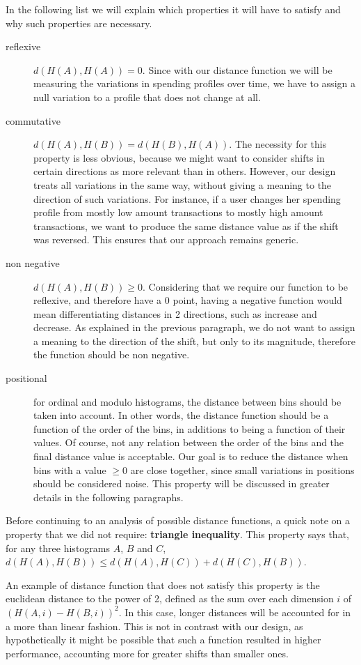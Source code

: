 In the following list we will explain which properties it will have to satisfy and why such properties are necessary.
\begin{description}
  \item[reflexive] $d(H(A), H(A)) = 0$. Since with our distance function we will be measuring the variations in spending profiles over time, we have to assign a null variation to a profile that does not change at all.
  \item[commutative] $d(H(A), H(B)) = d(H(B), H(A))$. The necessity for this property is less obvious, because we might want to consider shifts in certain directions as more relevant than in others. However, our design treats all variations in the same way, without giving a meaning to the direction of such variations. For instance, if a user changes her spending profile from mostly low amount transactions to mostly high amount transactions, we want to produce the same distance value as if the shift was reversed. This ensures that our approach remains generic.
  \item[non negative] $d(H(A), H(B)) \geq 0$. Considering that we require our function to be reflexive, and therefore have a $0$ point, having a negative function would mean differentiating distances in 2 directions, such as increase and decrease. As explained in the previous paragraph, we do not want to assign a meaning to the direction of the shift, but only to its magnitude, therefore the function should be non negative.
  \item[positional] for ordinal and modulo histograms, the distance between bins should be taken into account. In other words, the distance function should be a function of the order of the bins, in additions to being a function of their values. Of course, not any relation between the order of the bins and the final distance value is acceptable. Our goal is to reduce the distance when bins with a value $\geq 0$ are close together, since small variations in positions should be considered noise. This property will be discussed in greater details in the following paragraphs.
\end{description}

Before continuing to an analysis of possible distance functions, a quick note on a property that we did not require: \textbf{triangle inequality}. This property says that, for any three histograms $A$, $B$ and $C$, $d(H(A), H(B)) \leq d(H(A), H(C)) + d(H(C), H(B))$.

An example of distance function that does not satisfy this property is the euclidean distance to the power of 2, defined as the sum over each dimension $i$ of $(H(A,i) - H(B,i))^2$. In this case, longer distances will be accounted for in a more than linear fashion. This is not in contrast with our design, as hypothetically it might be possible that such a function resulted in higher performance, accounting more for greater shifts than smaller ones.

